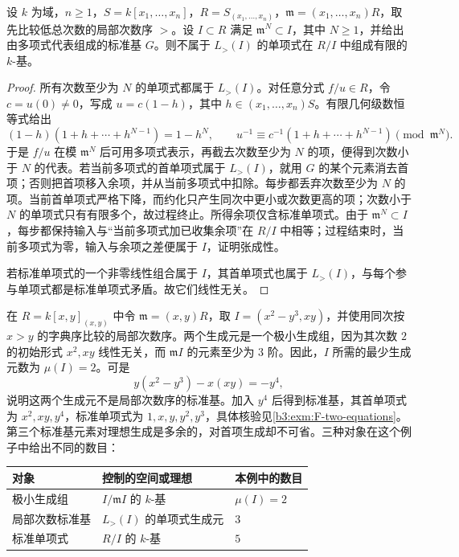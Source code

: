 \begin{proposition}\label{b3:prop:F-finite-staircase}
	设 \(k\) 为域，\(n\ge1\)，\(S=k[x_1,\ldots,x_n]\)，\(R=S_{(x_1,\ldots,x_n)}\)，\(\mathfrak m=(x_1,\ldots,x_n)R\)，取先比较低总次数的局部次数序 \(>\)。设 \(I\subset R\) 满足 \(\mathfrak m^N\subset I\)，其中 \(N\ge1\)，并给出由多项式代表组成的标准基 \(G\)。则不属于 \(L_{>}(I)\) 的单项式在 \(R/I\) 中组成有限的 \(k\)-基。
\end{proposition}
\begin{proof}
	所有次数至少为 \(N\) 的单项式都属于 \(L_{>}(I)\)。对任意分式 \(f/u\in R\)，令 \(c=u(0)\ne0\)，写成 \(u=c(1-h)\)，其中 \(h\in(x_1,\ldots,x_n)S\)。有限几何级数恒等式给出
	\[
		(1-h)(1+h+\cdots+h^{N-1})=1-h^N, \qquad u^{-1}\equiv c^{-1}(1+h+\cdots+h^{N-1}) \pmod{\mathfrak m^N}.
	\]
	于是 \(f/u\) 在模 \(\mathfrak m^N\) 后可用多项式表示，再截去次数至少为 \(N\) 的项，便得到次数小于 \(N\) 的代表。若当前多项式的首单项式属于 \(L_{>}(I)\)，就用 \(G\) 的某个元素消去首项；否则把首项移入余项，并从当前多项式中扣除。每步都丢弃次数至少为 \(N\) 的项。当前首单项式严格下降，而约化只产生同次中更小或次数更高的项；次数小于 \(N\) 的单项式只有有限多个，故过程终止。所得余项仅含标准单项式。由于 \(\mathfrak m^N\subset I\)，每步都保持输入与“当前多项式加已收集余项”在 \(R/I\) 中相等；过程结束时，当前多项式为零，输入与余项之差便属于 \(I\)，证明张成性。

	若标准单项式的一个非零线性组合属于 \(I\)，其首单项式也属于 \(L_{>}(I)\)，与每个参与单项式都是标准单项式矛盾。故它们线性无关。
\end{proof}

\begin{example}\label{b3:exm:F-three-bases}
	在 \(R=k[x,y]_{(x,y)}\) 中令 \(\mathfrak m=(x,y)R\)，取 \(I=(x^2-y^3,xy)\)，并使用同次按 \(x>y\) 的字典序比较的局部次数序。两个生成元是一个极小生成组，因为其次数 \(2\) 的初始形式 \(x^2,xy\) 线性无关，而 \(\mathfrak m I\) 的元素至少为 \(3\) 阶。因此，\(I\) 所需的最少生成元数为 \(\mu(I)=2\)。可是
	\[
		y(x^2-y^3)-x(xy)=-y^4,
	\]
	说明这两个生成元不是局部次数序的标准基。加入 \(y^4\) 后得到标准基，其首单项式为 \(x^2,xy,y^4\)，标准单项式为 \(1,x,y,y^2,y^3\)，具体核验见\cref{b3:exm:F-two-equations}。第三个标准基元素对理想生成是多余的，对首项生成却不可省。三种对象在这个例子中给出不同的数目：
	\begin{center}
		\begin{tabular}{lll}
			\toprule
			对象 & 控制的空间或理想 & 本例中的数目 \\
			\midrule
			极小生成组 & \(I/\mathfrak m I\) 的 \(k\)-基 & \(\mu(I)=2\) \\
			局部次数标准基 & \(L_{>}(I)\) 的单项式生成元 & \(3\) \\
			标准单项式 & \(R/I\) 的 \(k\)-基 & \(5\) \\
			\bottomrule
		\end{tabular}
	\end{center}
\end{example}

